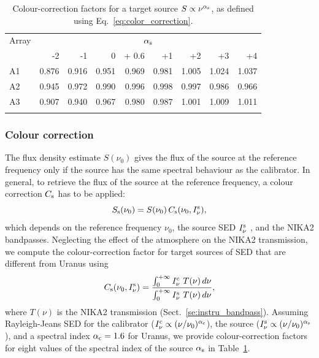 \documentclass[traditionalabstract]{aa}
\begin{document}
{\begin{table}[!thbp]
\caption{Colour-correction factors for a target source  $S \propto \nu^{\alpha_{\rm{s}}}$, as defined using Eq.~\ref{eq:color_correction}.}
\label{tab:mod}
\centering 
\begin{tabular}{lrrrrrrrr}
\hline\hline
\noalign{\smallskip}
Array     & \multicolumn{8}{c}{$\alpha_{\rm{s}}$} \\
\noalign{\smallskip}
\hline
\noalign{\smallskip}
         &  -2 &  -1    &    0  & + 0.6 & +1  &  +2  & +3 & +4  \\       
\noalign{\smallskip}
\hline
\noalign{\smallskip}
          A1   & 0.876  &  0.916   &   0.951  & 0.969 &  0.981   &  1.005  &    1.024  &  1.037   \\
          A2   & 0.945  &  0.972   &   0.990  & 0.996 &  0.998   &  0.997  &    0.986  &  0.966      \\ 
          A3   & 0.907  &  0.940   &   0.967  & 0.980 &  0.987   &  1.001  &    1.009  &  1.011     \\
            \noalign{\smallskip}
            \hline
\end{tabular}
\end{table}

\subsubsection{Colour correction}

The flux density estimate $S(\nu_{0})$ gives the
flux of the source at the reference frequency only if the source has
the same spectral behaviour as the calibrator. In general, to retrieve the
flux of the source at the reference frequency, a colour correction
$C_{\rm{s}}$ has to be applied:
\begin{equation}
S_{\rm{s}}(\nu_{0}) = S(\nu_{0}) \,  C_{\rm{s}}(\nu_{0}, I_\nu^{\rm{s}}),
\end{equation}
which depends on the reference frequency $\nu_{0}$, the source
SED $I_\nu^{\rm{s}}$ , and the NIKA2 bandpasses.
Neglecting the effect of the atmosphere on the NIKA2 transmission, we
compute the colour-correction factor for target sources of SED that are
different from Uranus using
\begin{equation}
  C_{\rm{s}}(\nu_{0}, I_\nu^{\rm{s}}) = \frac{\int_{0}^{+\infty} I_\nu^{\rm{c}}~T({\nu})\, d\nu}{ \int_{0}^{+\infty} I_\nu^{\rm{s}}~ T({\nu})\, d\nu},
    \label{eq:color_correction}
\end{equation}
where $T({\nu})$ is the NIKA2 transmission
(Sect.~\ref{se:instru_bandpass}).
Assuming Rayleigh-Jeans SED for the calibrator
($I_\nu^{\rm{c}} \propto (\nu/\nu_0)^{\alpha_{\rm{c}}}$), the source
($I_\nu^{\rm{s}} \propto (\nu/\nu_0)^{\alpha_{\rm{s}}}$), and a
spectral index $\alpha_{\rm{c}} = 1.6$ for Uranus, we provide colour-correction factors for eight values of the spectral index of the
source $\alpha_{\rm{s}}$ in Table~\ref{tab:mod}.


}
\end{document}
